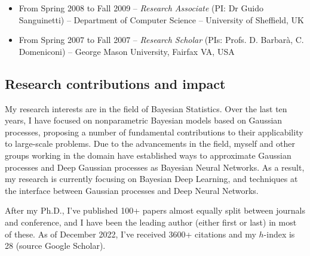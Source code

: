 \documentclass[oneside, a4paper, onecolumn, 10pt]{article}
\begin{document}
\begin{itemize}
\item From Spring 2008 to Fall 2009 -- {\em Research Associate} (PI: Dr Guido Sanguinetti) -- %
  Department of Computer Science -- University of Sheffield, UK %

\item From Spring 2007 to Fall 2007 -- {\em Research Scholar} (PIs: Profs. D. Barbar\`a, C. Domeniconi) -- %
  George Mason University, Fairfax VA, USA %
  
\end{itemize}



	
	
\subsection*{Research contributions and impact}

My research interests are in the field of Bayesian Statistics. 
Over the last ten years, I have focused on nonparametric Bayesian models based on Gaussian processes, proposing a number of fundamental contributions to their applicability to large-scale problems.
Due to the advancements in the field, myself and other groups working in the domain have established ways to approximate Gaussian processes and Deep Gaussian processes as Bayesian Neural Networks. 
As a result, my research is currently focusing on Bayesian Deep Learning, and techniques at the interface between Gaussian processes and Deep Neural Networks. 

After my Ph.D., I've published 100+ papers almost equally split between journals and conference, and I have been the leading author (either first or last) in most of these.
As of December 2022, I've received 3600+ citations and my $h$-index is 28 (source Google Scholar).
\end{document}
